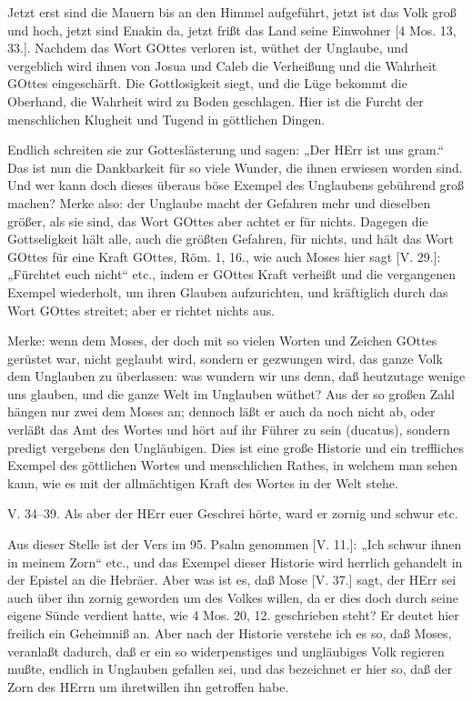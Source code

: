 Jetzt erst sind die Mauern bis an den Himmel aufgeführt, jetzt ist das Volk groß und hoch, jetzt sind Enakin da, jetzt frißt das Land seine Einwohner [4 Mos. 13, 33.]. Nachdem das Wort GOttes verloren ist, wüthet der Unglaube, und vergeblich wird ihnen von Josua und Caleb die Verheißung und die Wahrheit GOttes eingeschärft. Die Gottlosigkeit siegt, und die Lüge bekommt die Oberhand, die Wahrheit wird zu Boden geschlagen. Hier ist die Furcht der menschlichen Klugheit und Tugend in göttlichen Dingen.

Endlich schreiten sie zur Gotteslästerung und sagen: „Der HErr ist uns gram.“ Das ist nun die Dankbarkeit für so viele Wunder, die ihnen erwiesen worden sind. Und wer kann doch dieses überaus böse Exempel des Unglaubens gebührend groß machen? Merke also: der Unglaube macht der Gefahren mehr und dieselben größer, als sie sind, das Wort GOttes aber achtet er für nichts. Dagegen die Gottseligkeit hält alle, auch die größten Gefahren, für nichts, und hält das Wort GOttes für eine Kraft GOttes, Röm. 1, 16., wie auch Moses hier sagt [V. 29.]: „Fürchtet euch nicht“ etc., indem er GOttes Kraft verheißt und die vergangenen Exempel wiederholt, um ihren Glauben aufzurichten, und kräftiglich durch das Wort GOttes streitet; aber er richtet nichts aus.

Merke: wenn dem Moses, der doch mit so vielen Worten und Zeichen GOttes gerüstet war, nicht geglaubt wird, sondern er gezwungen wird, das ganze Volk dem Unglauben zu überlassen: was wundern wir uns denn, daß heutzutage wenige uns glauben, und die ganze Welt im Unglauben wüthet? Aus der so großen Zahl hängen nur zwei dem Moses an; dennoch läßt er auch da noch nicht ab, oder verläßt das Amt des Wortes und hört auf ihr Führer zu sein (ducatus), sondern predigt vergebens den Ungläubigen. Dies ist eine große Historie und ein treffliches Exempel des göttlichen Wortes
und menschlichen Rathes, in welchem man sehen kann, wie es mit der allmächtigen Kraft des Wortes in der Welt stehe.

\begin{schriftzitat}
V. 34–39. Als aber der HErr euer Geschrei hörte, ward er zornig und schwur etc.
\end{schriftzitat}

Aus dieser Stelle ist der Vers im 95. Psalm genommen [V. 11.]: „Ich schwur ihnen in meinem Zorn“ etc., und das Exempel dieser Historie wird herrlich gehandelt in der Epistel an die Hebräer. Aber was ist es, daß Mose [V. 37.] sagt, der HErr sei auch über ihn zornig geworden um des Volkes willen, da er dies doch durch seine eigene Sünde verdient hatte, wie 4 Mos. 20, 12. geschrieben steht? Er deutet hier freilich ein Geheimniß an. Aber nach der Historie verstehe ich es so, daß Moses, veranlaßt dadurch, daß er ein so widerpenstiges und ungläubiges Volk regieren mußte, endlich in Unglauben gefallen sei, und das bezeichnet er hier so, daß der Zorn des HErrn um ihretwillen ihn getroffen habe.

